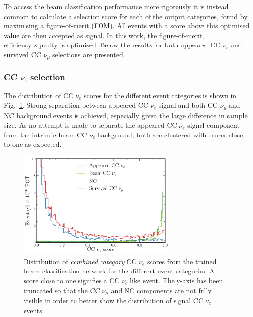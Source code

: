 To access the beam classification performance more rigorously it is instead common to calculate a
selection score for each of the output categories, found by maximising a figure-of-merit (FOM).
All events with a score above this optimised value are then accepted as signal. In this work, the
figure-of-merit, $\mathrm{efficiency}\times\mathrm{purity}$ is optimised. Below the results for
both appeared CC $\nu_{e}$ and survived CC $\nu_{\mu}$ selections are presented.

\subsubsection*{CC $\nu_{e}$ selection} %

The distribution of CC $\nu_{e}$ scores for the different event categories is shown in
Fig.~\ref{fig:final_beam_nuel_outputs}. Strong separation between appeared CC $\nu_{e}$ signal and
both CC $\nu_{\mu}$ and NC background events is achieved, especially given the large difference in
sample size. As no attempt is made to separate the appeared CC $\nu_{e}$ signal component from the
intrinsic beam CC $\nu_{e}$ background, both are clustered with scores close to one as expected.

\begin{figure} %
    \includegraphics[width=0.7\textwidth]{diagrams/7-results/final_beam_nuel_outputs.pdf}
    \caption[Distribution of CC $\nu_{e}$ scores from the trained beam classification network]
    {Distribution of \emph{combined category} CC $\nu_{e}$ scores from the trained beam
        classification network for the different event categories. A score close to one signifies
        a CC $\nu_{e}$ like event. The y-axis has been truncated so that the CC $\nu_{\mu}$ and NC
        components are not fully visible in order to better show the distribution of signal CC
        $\nu_{e}$ events.}
    \label{fig:final_beam_nuel_outputs}
\end{figure}


